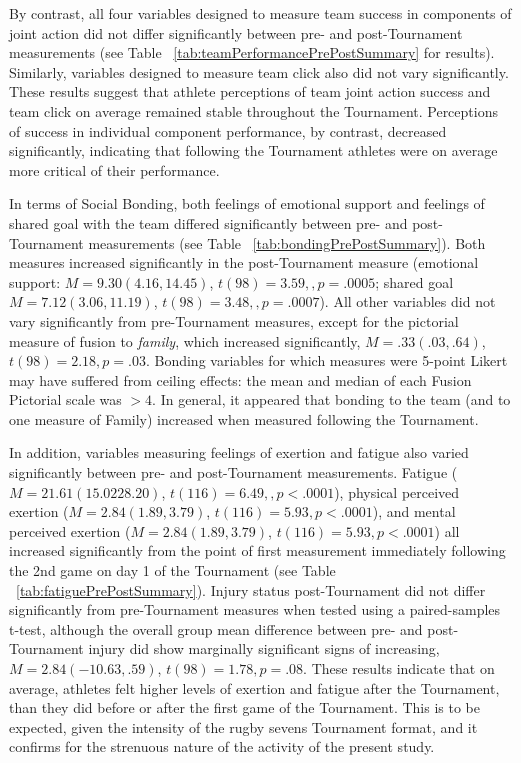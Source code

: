 By contrast, all four variables designed to measure team success in components of joint action did not differ significantly between pre- and post-Tournament measurements (see Table ~\ref{tab:teamPerformancePrePostSummary} for results).  Similarly, variables designed to measure team click also did not vary significantly.  These results suggest that athlete perceptions of team joint action success and team click on average remained stable throughout the Tournament.  Perceptions of success in individual component performance, by contrast, decreased significantly, indicating that following the Tournament athletes were on average more critical of their performance.

In terms of Social Bonding, both feelings of emotional support and feelings of shared goal with the team differed significantly between pre- and post-Tournament measurements (see Table ~\ref{tab:bondingPrePostSummary}). Both measures increased significantly in the post-Tournament measure (emotional support: $M = 9.30 (4.16, 14.45)$, $t(98)= 3.59,, p = .0005$; shared goal $M = 7.12 (3.06, 11.19)$, $t(98)= 3.48,, p = .0007$).  All other variables did not vary significantly from pre-Tournament measures, except for the pictorial measure of fusion to \textit{family}, which increased significantly, $M = .33(.03, .64)$, $t(98)= 2.18, p = .03$.  Bonding variables for which measures were 5-point Likert may have suffered from ceiling effects: the mean and median of each Fusion Pictorial scale was $> 4$.  In general, it appeared that bonding to the team (and to one measure of Family) increased when measured following the Tournament.

In addition, variables measuring feelings of exertion and fatigue also varied significantly between pre- and post-Tournament measurements.  Fatigue ($M = 21.61 (15.02 28.20)$, $t(116)= 6.49,, p < .0001$), physical perceived exertion ($M = 2.84 (1.89, 3.79)$, $t(116)= 5.93, p < .0001$), and mental perceived exertion ($M = 2.84 (1.89, 3.79)$, $t(116)= 5.93, p < .0001$) all increased significantly from the point of first measurement immediately following the 2nd game on day 1 of the Tournament (see Table ~\ref{tab:fatiguePrePostSummary}).  Injury status post-Tournament did not differ significantly from pre-Tournament measures when tested using a paired-samples t-test, although the overall group mean difference between pre- and post-Tournament injury did show marginally significant signs of increasing, $M = 2.84 (-10.63, .59)$, $t(98)= 1.78, p = .08$.
These results indicate that on average, athletes felt higher levels of exertion and fatigue after the Tournament, than they did before or after the first game of the Tournament. This is to be expected, given the intensity of the rugby sevens Tournament format, and it confirms for the strenuous nature of the activity of the present study.





